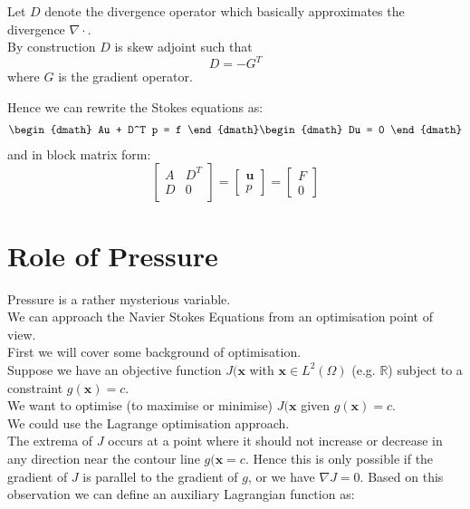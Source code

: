 \begin{center}
Let $D$ denote the divergence operator which basically approximates the divergence $\nabla \cdot$.\\
By construction $D$ is skew adjoint such that 
\begin{equation}
D = -G^T
\end{equation}
where $G$ is the gradient operator.
\end{center}

Hence we can rewrite the Stokes equations as:
\begin{dgroup}
\begin{dmath}
Au + D^T p = f
\end{dmath}
\begin{dmath}
Du = 0
\end{dmath}
\end{dgroup}
and in block matrix form:
\begin{equation}
\begin{bmatrix}
A & D^T \\
D & 0\\
\end{bmatrix}
= \begin{bmatrix}
\textbf{u}\\
\textit{p}
\end{bmatrix}
= \begin{bmatrix}
\textit{F}\\
0
\end{bmatrix}
\end{equation}


\section{Role of Pressure}
Pressure is a rather mysterious variable.\\
We can approach the Navier Stokes Equations from an optimisation point of view.\\

First we will cover some background of optimisation.\\

Suppose we have an objective function $J (\textbf{x}$ with $\textbf{x} \in L^2 (\Omega)$ (e.g. $\mathbb{R}$) subject to a constraint $g(\textbf{x}) = c$.\\
We want to optimise (to maximise or minimise) $J (\textbf{x}$ given $g(\textbf{x}) = c$.\\

We could use the Lagrange optimisation approach. \\
The extrema of $J$ occurs at a point where it should not increase or decrease in any direction near the contour line $g (\textbf{x} = c$. Hence this is only possible if the gradient of $J$ is parallel to the gradient of $g$, or we have $\nabla J = 0$. Based on this observation we can define an auxiliary Lagrangian function as:


